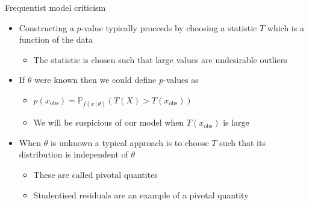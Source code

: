 \begin{frame}{Frequentist model criticism}
  \begin{itemize}
    \item Constructing a $p$-value typically proceeds by choosing a statistic $T$ which is a function of the data
    \begin{itemize}
      \item The statistic is chosen such that large values are undesirable \eg outliers
    \end{itemize}
    \vspace{\baselineskip}
    \pause
    \item If $\theta$ were known then we could define $p$-values as
    \begin{itemize}
      \item $p(x_{\textrm{obs}}) = \mathbb{P}_{f(x\,|\,\theta)}(T(X) > T(x_{\textrm{obs}}))$
      \item \ie We will be suspicious of our model when $T(x_{\textrm{obs}})$ is large
    \end{itemize}
    \vspace{\baselineskip}
    \pause
    \item When $\theta$ is unknown a typical approach is to choose $T$ such that its distribution is independent of $\theta$
    \begin{itemize}
      \item These are called pivotal quantites
      \item Studentised residuals are an example of a pivotal quantity
    \end{itemize}
  \end{itemize}
\end{frame}


